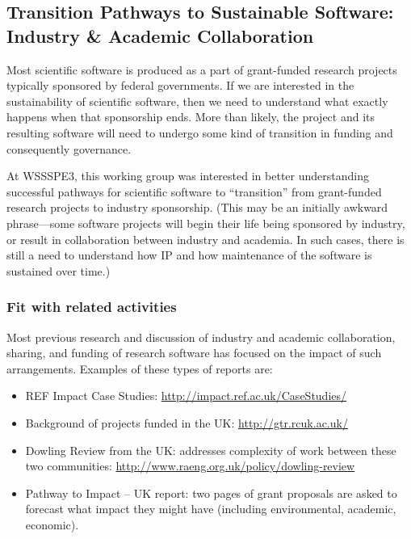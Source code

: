 
\subsection{Transition Pathways to Sustainable Software: Industry \& Academic Collaboration}
\label{sec:industry_interaction}


Most scientific software is produced as a part of grant-funded research projects
typically sponsored by federal governments. If we are interested in the
sustainability of scientific software, then we need to understand what exactly
happens when that sponsorship ends. More than likely, the project and its
resulting software will need to undergo some kind of transition in funding and
consequently governance.

At WSSSPE3, this working group was interested in better understanding successful pathways
for scientific software to ``transition'' from grant-funded research projects to
industry sponsorship. (This may be an initially awkward phrase---some software
projects will begin their life being sponsored by industry, or result in
collaboration between industry and academia. In such cases, there is still a
need to understand how IP and how maintenance of the software is sustained over
time.)

\subsubsection{Fit with related activities}

Most previous research and discussion of industry and academic collaboration,
sharing, and funding of research software has focused on the impact of such
arrangements. Examples of these types of reports are:

\begin{itemize}
\item REF Impact Case Studies: \url{http://impact.ref.ac.uk/CaseStudies/}
\item Background of projects funded in the UK: \url{http://gtr.rcuk.ac.uk/}
\item Dowling Review from the UK: addresses complexity of work between these two
communities: \url{http://www.raeng.org.uk/policy/dowling-review}
\item Pathway to Impact -- UK report: two pages of grant proposals are asked to
forecast what impact they might have (including environmental, academic, economic).
\end{itemize}

